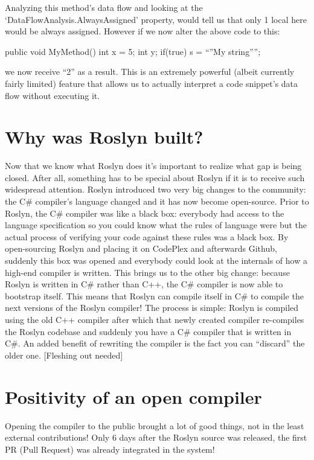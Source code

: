 Analyzing this method’s data flow and looking at the ‘DataFlowAnalysis.AlwaysAssigned’ property, would tell us that only 1 local here would be always assigned. However if we now alter the above code to this:

   public void MyMethod()
   {
      int x = 5;
      int y;
      if(true)
         s = “”My string””;
   }
	
we now receive “2” as a result. This is an extremely powerful (albeit currently fairly limited) feature that allows us to actually interpret a code snippet’s data flow without executing it.


\section{Why was Roslyn built?}
\label{sec:intro-why}

Now that we know what Roslyn does it’s important to realize what gap is being closed. After all, something has to be special about Roslyn if it is to receive such widespread attention.
Roslyn introduced two very big changes to the community: the C# compiler’s language changed and it has now become open-source. Prior to Roslyn, the C# compiler was like a black box: everybody had access to the language specification so you could know what the rules of language were but the actual process of verifying your code against these rules was a black box. By open-sourcing Roslyn and placing it on CodePlex and afterwards Github, suddenly this box was opened and everybody could look at the internals of how a high-end compiler is written.
This brings us to the other big change: because Roslyn is written in C# rather than C++, the C# compiler is now able to bootstrap itself. This means that Roslyn can compile itself in C# to compile the next versions of the Roslyn compiler! The process is simple: Roslyn is compiled using the old C++ compiler after which that newly created compiler re-compiles the Roslyn codebase and suddenly you have a C# compiler that is written in C#. 
An added benefit of rewriting the compiler is the fact you can “discard” the older one. [Fleshing out needed]

\section{Positivity of an open compiler}
\label{sec:intro-pos-comp}

Opening the compiler to the public brought a lot of good things, not in the least external contributions! Only 6 days after the Roslyn source was released, the first PR (Pull Request) was already integrated in the system!

